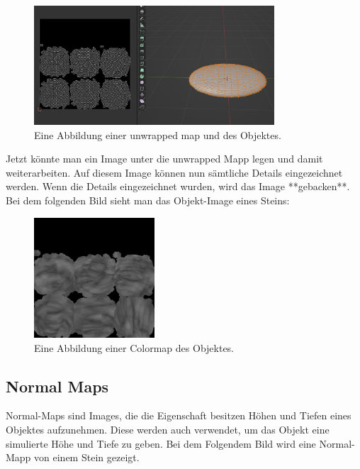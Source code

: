 \begin{figure}[H]
    \centering
    \includegraphics[width=0.8\textwidth]{chapters/11/Images/StoneAndUnwrap.png}
    \caption{Eine Abbildung einer unwrapped map und des Objektes.}
    \label{htl01}
\end{figure}

\noindent Jetzt könnte man ein Image unter die unwrapped Mapp legen und damit weiterarbeiten. Auf diesem Image können nun sämtliche Details eingezeichnet werden. Wenn die Details eingezeichnet wurden, wird das Image **gebacken**. Bei dem folgenden Bild sieht man das Objekt-Image eines Steins:

\begin{figure}[H]
    \centering
    \includegraphics[width=0.4\textwidth]{chapters/11/Images/SteinColor.png}
    \caption{Eine Abbildung einer Colormap des Objektes.}
    \label{htl01}
\end{figure}

\subsection{Normal Maps}

Normal-Maps sind Images, die die Eigenschaft besitzen Höhen und Tiefen eines Objektes aufzunehmen. Diese werden auch verwendet, um das Objekt eine simulierte Höhe und Tiefe zu geben. Bei dem Folgendem Bild wird eine Normal-Mapp von einem Stein gezeigt.


